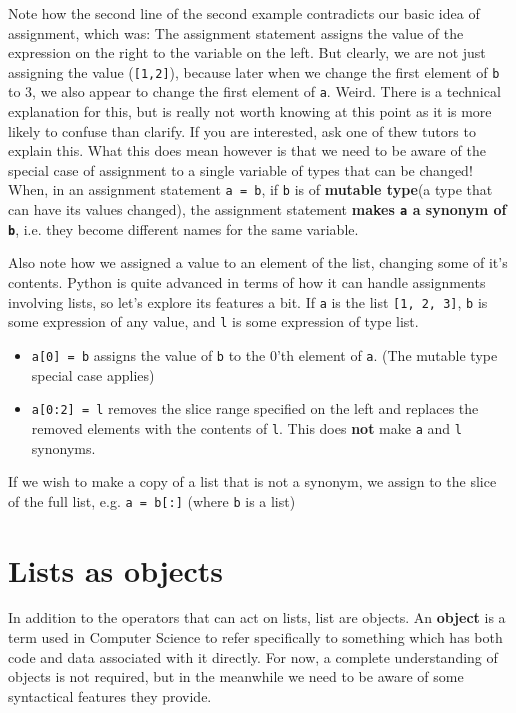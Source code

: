Note how the second line of the second example contradicts our basic idea   of assignment, which was: The assignment statement assigns the value of   the expression on the right to the variable on the left. But clearly,   we are not just assigning the value (\texttt{[1,2]}), because later when we   change the first element of \texttt{b} to 3, we also appear to change the   first element of \texttt{a}. Weird. There is a technical explanation for this,   but is really not worth knowing at this point as it is more likely to   confuse than clarify. If you are interested, ask one of thew tutors to explain this. What this does mean however is that we need to be   aware of the special case of assignment to a single variable of   types that can be changed!     When, in an assignment statement 
\texttt{a = b}, if \texttt{b} is of    \textbf{mutable type}(a type that can have its values     changed), the assignment statement    \textbf{makes \texttt{a} a synonym of \texttt{b}}, i.e. they become    different names for the same variable.    

Also note how we assigned a value to an element of the list,   changing some of it's contents. Python is quite advanced in terms of   how it can handle assignments involving lists, so let's explore its   features a bit. If \texttt{a} is the list \texttt{[1, 2, 3]}, \texttt{b} is some expression of   any value, and \texttt{l} is some expression of type list.
\begin{itemize}
	\item 
\texttt{a[0] = b} assigns the value of \texttt{b} to the 0'th    element of \texttt{a}. (The mutable type special case applies)
	\item 
\texttt{a[0:2] = l} removes the slice range specified on    the left and replaces the removed elements with the contents of    \texttt{l}. This does \textbf{not} make \texttt{a} and \texttt{l} synonyms.
\end{itemize}

If we wish to make a copy of a list that is not a synonym, we assign   to the slice of the full list, e.g. 
\texttt{a = b[:]} (where \texttt{b} is   a list)

\section{Lists as objects}

In addition to the operators that can act on lists, list are   objects. An \textbf{object} is a term used in Computer Science to   refer specifically to something which has both code and data associated   with it directly. For now, a complete understanding of objects is not required, but in the meanwhile we need to be aware of some   syntactical features they provide.

